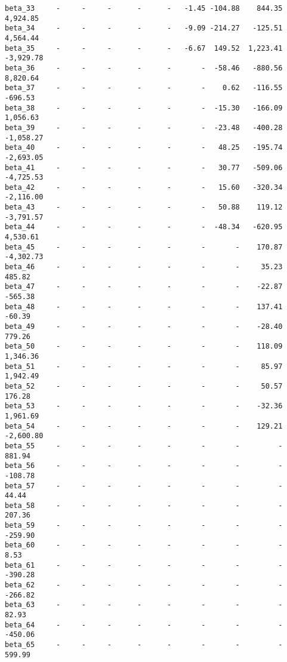 \documentclass[11pt]{article}
\begin{document}
\begin{verbatim}
beta_33     -     -     -      -      -   -1.45 -104.88    844.35  4,924.85
beta_34     -     -     -      -      -   -9.09 -214.27   -125.51  4,564.44
beta_35     -     -     -      -      -   -6.67  149.52  1,223.41 -3,929.78
beta_36     -     -     -      -      -       -  -58.46   -880.56  8,820.64
beta_37     -     -     -      -      -       -    0.62   -116.55   -696.53
beta_38     -     -     -      -      -       -  -15.30   -166.09  1,056.63
beta_39     -     -     -      -      -       -  -23.48   -400.28 -1,058.27
beta_40     -     -     -      -      -       -   48.25   -195.74 -2,693.05
beta_41     -     -     -      -      -       -   30.77   -509.06 -4,725.53
beta_42     -     -     -      -      -       -   15.60   -320.34 -2,116.00
beta_43     -     -     -      -      -       -   50.88    119.12 -3,791.57
beta_44     -     -     -      -      -       -  -48.34   -620.95  4,530.61
beta_45     -     -     -      -      -       -       -    170.87 -4,302.73
beta_46     -     -     -      -      -       -       -     35.23    485.82
beta_47     -     -     -      -      -       -       -    -22.87   -565.38
beta_48     -     -     -      -      -       -       -    137.41    -60.39
beta_49     -     -     -      -      -       -       -    -28.40    779.26
beta_50     -     -     -      -      -       -       -    118.09  1,346.36
beta_51     -     -     -      -      -       -       -     85.97  1,942.49
beta_52     -     -     -      -      -       -       -     50.57    176.28
beta_53     -     -     -      -      -       -       -    -32.36  1,961.69
beta_54     -     -     -      -      -       -       -    129.21 -2,600.80
beta_55     -     -     -      -      -       -       -         -    881.94
beta_56     -     -     -      -      -       -       -         -   -108.78
beta_57     -     -     -      -      -       -       -         -     44.44
beta_58     -     -     -      -      -       -       -         -    207.36
beta_59     -     -     -      -      -       -       -         -   -259.90
beta_60     -     -     -      -      -       -       -         -      8.53
beta_61     -     -     -      -      -       -       -         -   -390.28
beta_62     -     -     -      -      -       -       -         -   -266.82
beta_63     -     -     -      -      -       -       -         -     82.93
beta_64     -     -     -      -      -       -       -         -   -450.06
beta_65     -     -     -      -      -       -       -         -    599.99
    \end{verbatim}
\end{document}
